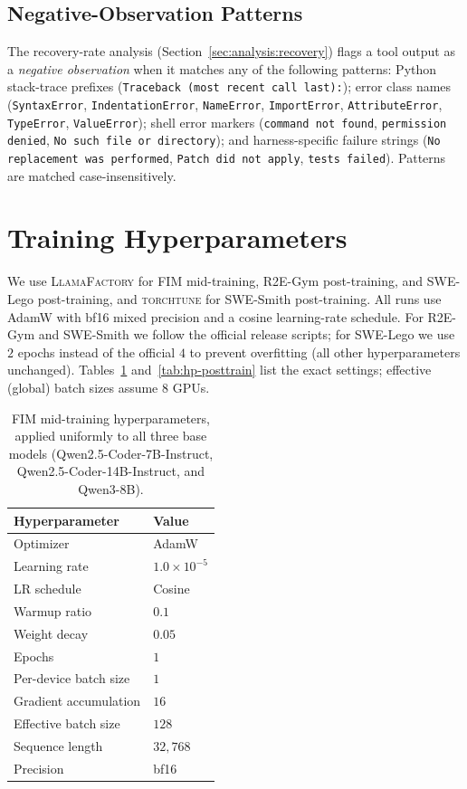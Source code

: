 \subsection{Negative-Observation Patterns}
\label{app:algo:neg_patterns}

The recovery-rate analysis (Section~\ref{sec:analysis:recovery}) flags
a tool output as a \emph{negative observation} when it matches any of
the following patterns: Python stack-trace prefixes
(\texttt{Traceback (most recent call last):}); error class names
(\texttt{SyntaxError}, \texttt{IndentationError}, \texttt{NameError},
\texttt{ImportError}, \texttt{AttributeError}, \texttt{TypeError},
\texttt{ValueError}); shell error markers
(\texttt{command not found}, \texttt{permission denied}, \texttt{No such file or directory});
and harness-specific failure strings
(\texttt{No replacement was performed}, \texttt{Patch did not apply},
\texttt{tests failed}). Patterns are matched case-insensitively.

\section{Training Hyperparameters}
\label{app:hp}

We use \textsc{LlamaFactory} for FIM mid-training, R2E-Gym
post-training, and SWE-Lego post-training, and \textsc{torchtune} for
SWE-Smith post-training. All runs use AdamW with bf16 mixed precision
and a cosine learning-rate schedule. For R2E-Gym and SWE-Smith we follow
the official release scripts; for SWE-Lego we use $2$ epochs instead of
the official $4$ to prevent overfitting (all other hyperparameters
unchanged). Tables~\ref{tab:hp-midtrain} and~\ref{tab:hp-posttrain} list
the exact settings; effective (global) batch sizes assume $8$ GPUs.

\begin{table}[h]
\centering
\footnotesize
\caption{FIM mid-training hyperparameters, applied uniformly to all
three base models (Qwen2.5-Coder-7B-Instruct,
Qwen2.5-Coder-14B-Instruct, and Qwen3-8B).}
\label{tab:hp-midtrain}
\setlength{\tabcolsep}{8pt}
\begin{tabular}{ll}
\toprule
\textbf{Hyperparameter} & \textbf{Value} \\
\midrule
Optimizer             & AdamW \\
Learning rate         & $1.0\!\times\!10^{-5}$ \\
LR schedule           & Cosine \\
Warmup ratio          & $0.1$ \\
Weight decay          & $0.05$ \\
Epochs                & $1$ \\
Per-device batch size & $1$ \\
Gradient accumulation & $16$ \\
Effective batch size  & $128$ \\
Sequence length       & $32{,}768$ \\
Precision             & bf16 \\
\bottomrule
\end{tabular}
\end{table}

